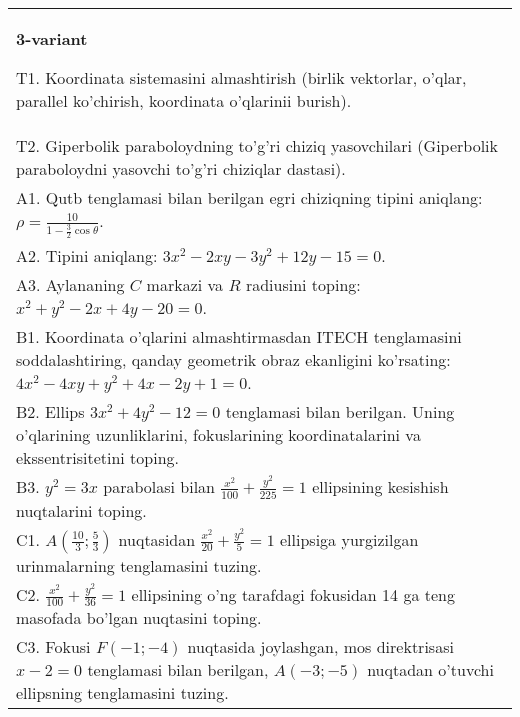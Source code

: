 \documentclass{article}
\begin{document}
\begin{tabular}{m{17cm}}
\textbf{3-variant}
\newline

T1. Koordinata sistemasini almashtirish (birlik vektorlar, o'qlar, parallel ko'chirish, koordinata o'qlarinii burish).\\

T2. Giperbolik paraboloydning to'g'ri chiziq yasovchilari (Giperbolik paraboloydni yasovchi to'g'ri chiziqlar dastasi).\\

A1. Qutb tenglamasi bilan berilgan egri chiziqning tipini aniqlang: $\rho=\frac{10}{1-\frac{3}{2}\cos\theta}$.\\

A2. Tipini aniqlang: $3x^{2}-2xy-3y^{2}+12y-15=0$.\\

A3. Aylananing $C$ markazi va $R$ radiusini toping: $x^2+y^2-2x+4y-20=0$.\\

B1. Koordinata o'qlarini almashtirmasdan ITECH tenglamasini soddalashtiring, qanday geometrik obraz ekanligini ko'rsating: $4x^{2} - 4xy + y^{2} + 4x - 2y + 1 = 0$.  \\

B2. Ellips $3x^{2} + 4y^{2} - 12 = 0$ tenglamasi bilan berilgan. Uning o'qlarining uzunliklarini, fokuslarining koordinatalarini va ekssentrisitetini toping.  \\

B3. $y^{2} = 3x$ parabolasi bilan $\frac{x^{2}}{100} + \frac{y^{2}}{225} = 1$ ellipsining kesishish nuqtalarini toping.  \\

C1. $A(\frac{10}{3};\frac{5}{3})$ nuqtasidan $\frac{x^{2}}{20} + \frac{y^{2}}{5} = 1$ ellipsiga yurgizilgan urinmalarning tenglamasini tuzing.  \\

C2. $\frac{x^{2}}{100} + \frac{y^{2}}{36} = 1$ ellipsining o'ng tarafdagi fokusidan 14 ga teng masofada bo'lgan nuqtasini toping.  \\

C3. Fokusi $F( - 1; - 4)$ nuqtasida joylashgan, mos direktrisasi $x - 2 = 0$ tenglamasi bilan berilgan, $A( - 3; - 5)$ nuqtadan o'tuvchi ellipsning tenglamasini tuzing.  \\

\end{tabular}
\vspace{1cm}
\end{document}
